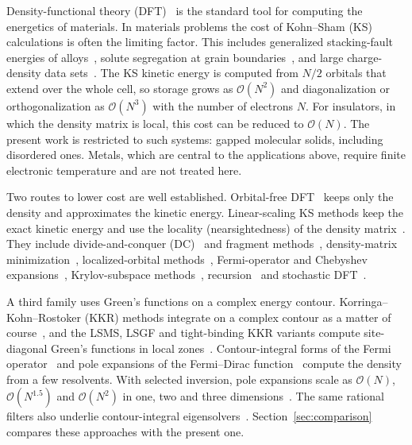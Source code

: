 \documentclass[aps,prb,twocolumn,superscriptaddress,floatfix,longbibliography]{revtex4-2}
\theoremstyle{remark}
\begin{document}
Density-functional theory (DFT)~\cite{HK1964,KS1965} is the standard tool for computing the energetics of materials.
In materials problems the cost of Kohn--Sham (KS) calculations is often the limiting factor. This includes generalized
stacking-fault energies of alloys~\cite{Linda2024PRB}, solute segregation at grain boundaries~\cite{Linda2026Acta},
and large charge-density data sets~\cite{Kumar2026JCIM}. The KS kinetic energy is computed from $N/2$ orbitals that extend
over the whole cell, so storage grows as $\mathcal O(N^2)$ and diagonalization or orthogonalization as $\mathcal O(N^3)$
with the number of electrons $N$. For insulators, in which the density matrix is local, this cost can be reduced to
$\mathcal O(N)$. The present work is restricted to such systems: gapped molecular solids, including disordered ones.
Metals, which are central to the applications above, require finite electronic temperature and are not treated here.

Two routes to lower cost are well established. Orbital-free DFT~\cite{WangTeter1992,WGC1999,HuangCarter2010} keeps only the
density and approximates the kinetic energy. Linear-scaling KS methods keep the exact kinetic energy and use the locality
(nearsightedness) of the density matrix~\cite{Kohn1996,ProdanKohn2005,Goedecker1999,BowlerMiyazaki2012}. They include
divide-and-conquer (DC)~\cite{Yang1991} and fragment methods~\cite{LS3DF2008}, density-matrix
minimization~\cite{LNV1993,ONETEP2005}, localized-orbital methods~\cite{MGC1993,BigDFTLS2014}, Fermi-operator and Chebyshev
expansions~\cite{Goedecker1999,WeisseKPM2006}, Krylov-subspace methods~\cite{Ozaki2006}, recursion~\cite{Haydock1972} and
stochastic DFT~\cite{BaerSDFT2013}.

A third family uses Green's functions on a complex energy contour. Korringa--Kohn--Rostoker (KKR) methods integrate on a
complex contour as a matter of course~\cite{ZellerDeutz1982}, and the LSMS, LSGF and tight-binding KKR variants compute
site-diagonal Green's functions in local zones~\cite{LSMS1995,LSGF1996,Zeller2008}. Contour-integral forms of the Fermi
operator~\cite{Goedecker1993,BaroniGiannozzi1992} and pole expansions of the Fermi--Dirac
function~\cite{LinLuYingE2009,LinMultipole2009,Moussa2016,Ozaki2007} compute the density from a few resolvents. With selected
inversion, pole expansions scale as $\mathcal O(N)$, $\mathcal O(N^{1.5})$ and $\mathcal O(N^2)$ in one, two and three
dimensions~\cite{PEXSI2013}. The same rational filters also underlie contour-integral
eigensolvers~\cite{SakuraiSugiura2003,Polizzi2009,Guettel2015,AustinTrefethen2015}. Section~\ref{sec:comparison} compares
these approaches with the present one.
\end{document}
